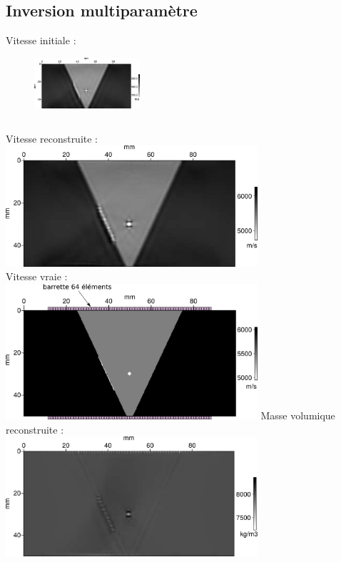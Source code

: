\documentclass[10pt,xcolor=x11names,compress, notes=show]{beamer}%
\begin{document}
\subsection{Inversion multiparamètre}
\begin{frame}{\insertsubsectionhead}
\begin{small}
	\centering
	Vitesse initiale :
	\begin{figure}
		\centering
		\includegraphics[width=0.35\textwidth]{img/vp_mono_smooth/vp_smooth.png}\\
	\end{figure}
	
	\begin{columns}
		\centering
		Vitesse reconstruite :\\[0.2cm]
		\includegraphics[width=0.7\textwidth]{img/multi/vp_multi_6000k.png}	\\
		
		Vitesse vraie : \\[0.2cm]
		\includegraphics[width=0.7\textwidth]{img/vp_true.png}
		\centering
		Masse volumique reconstruite :\\[0.2cm]
		\includegraphics[width=0.7\textwidth]{img/multi/rho_6000k.png}\\	
		

\end{columns}
\end{small}
\end{frame}
\end{document}
